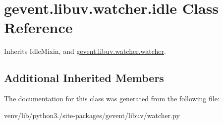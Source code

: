\hypertarget{classgevent_1_1libuv_1_1watcher_1_1idle}{}\section{gevent.\+libuv.\+watcher.\+idle Class Reference}
\label{classgevent_1_1libuv_1_1watcher_1_1idle}


Inherits Idle\+Mixin, and \hyperlink{classgevent_1_1libuv_1_1watcher_1_1watcher}{gevent.\+libuv.\+watcher.\+watcher}.

\subsection*{Additional Inherited Members}


The documentation for this class was generated from the following file\+:\begin{DoxyCompactItemize}
\item 
venv/lib/python3./site-\/packages/gevent/libuv/watcher.\+py\end{DoxyCompactItemize}
